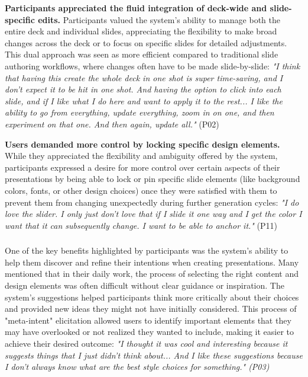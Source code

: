 \textbf{Participants appreciated the fluid integration of deck-wide and slide-specific edits.}
Participants valued the system’s ability to manage both the entire deck and individual slides, appreciating the flexibility to make broad changes across the deck or to focus on specific slides for detailed adjustments. This dual approach was seen as more efficient compared to traditional slide authoring workflows, where changes often have to be made slide-by-slide: \textit{"I think that having this create the whole deck in one shot is super time-saving, and I don't expect it to be hit in one shot. And having the option to click into each slide, and if I like what I do here and want to apply it to the rest... I like the ability to go from everything, update everything, zoom in on one, and then experiment on that one. And then again, update all."} (P02)



\textbf{Users demanded more control by locking specific design elements. }
While they appreciated the flexibility and ambiguity offered by the system, participants expressed a desire for more control over certain aspects of their presentations by being able to lock or pin specific slide elements (like background colors, fonts, or other design choices) once they were satisfied with them to prevent them from changing unexpectedly during further generation cycles: \textit{"I do love the slider. I only just don't love that if I slide it one way and I get the color I want that it can subsequently change. I want to be able to anchor it."} (P11)







\subsubsection{\textbf{}}


One of the key benefits highlighted by participants was the system’s ability to help them discover and refine their intentions when creating presentations. Many mentioned that in their daily work, the process of selecting the right content and design elements was often difficult without clear guidance or inspiration. The system’s suggestions helped participants think more critically about their choices and provided new ideas they might not have initially considered. This process of "meta-intent" elicitation allowed users to identify important elements that they may have overlooked or not realized they wanted to include, making it easier to achieve their desired outcome: \textit{"I thought it was cool and interesting because it suggests things that I just didn't think about... And I like these suggestions because I don't always know what are the best style choices for something." (P03)}




